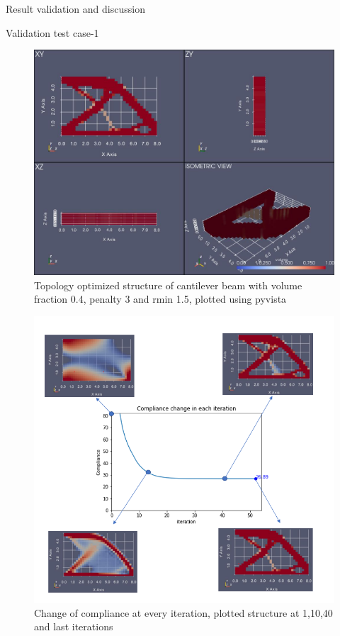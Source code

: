 \documentclass[a4paper,12pt,times]{article}
\begin{document}
\begin{section}{Result validation and discussion}
\begin{subsection}{Validation test case-1}
\begin{figure}[H]
\centering
\includegraphics[width=1\linewidth]{Numerical_result_full_MMA_01.jpg}
\centering
\caption{Topology optimized structure of cantilever beam with volume fraction 0.4, penalty 3 and rmin 1.5, plotted using pyvista}
\label{VC-01.3}
\end{figure}
\begin{figure}[H]
\centering
\includegraphics[width=0.85\linewidth]{Compliance_chg_MMA_01.png}
\centering
\caption{Change of compliance at every iteration, plotted structure at 1,10,40 and last iterations}


\end{figure}
\end{subsection}
\end{section}
\end{document}
